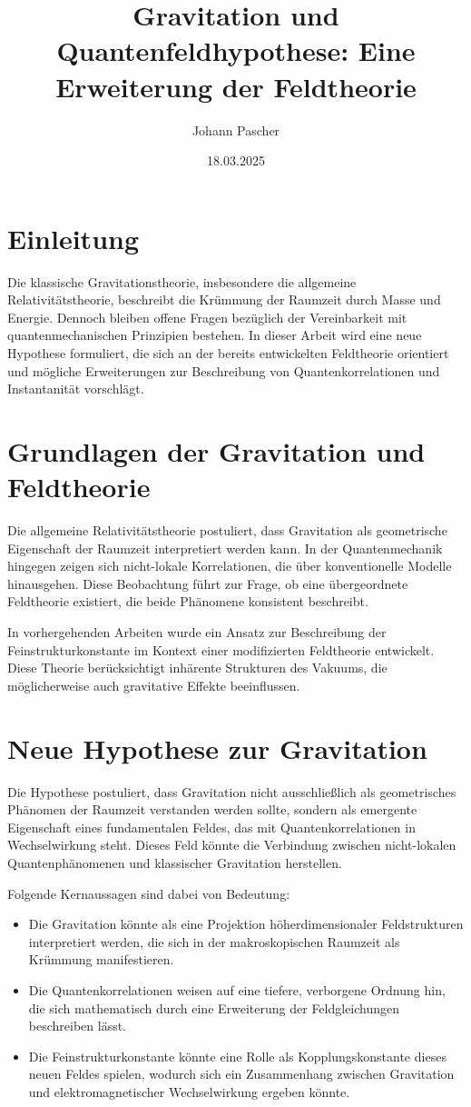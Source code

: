\documentclass[a4paper,11pt]{article}
\title{Gravitation und Quantenfeldhypothese: Eine Erweiterung der Feldtheorie}
\author{Johann Pascher}
\date{18.03.2025}
\begin{document}
	
	\maketitle
	\tableofcontents
	\section{Einleitung}
	Die klassische Gravitationstheorie, insbesondere die allgemeine Relativitätstheorie, beschreibt die Krümmung der Raumzeit durch Masse und Energie. Dennoch bleiben offene Fragen bezüglich der Vereinbarkeit mit quantenmechanischen Prinzipien bestehen. In dieser Arbeit wird eine neue Hypothese formuliert, die sich an der bereits entwickelten Feldtheorie orientiert und mögliche Erweiterungen zur Beschreibung von Quantenkorrelationen und Instantanität vorschlägt.
	
	\section{Grundlagen der Gravitation und Feldtheorie}
	Die allgemeine Relativitätstheorie postuliert, dass Gravitation als geometrische Eigenschaft der Raumzeit interpretiert werden kann. In der Quantenmechanik hingegen zeigen sich nicht-lokale Korrelationen, die über konventionelle Modelle hinausgehen. Diese Beobachtung führt zur Frage, ob eine übergeordnete Feldtheorie existiert, die beide Phänomene konsistent beschreibt.
	
	In vorhergehenden Arbeiten wurde ein Ansatz zur Beschreibung der Feinstrukturkonstante im Kontext einer modifizierten Feldtheorie entwickelt. Diese Theorie berücksichtigt inhärente Strukturen des Vakuums, die möglicherweise auch gravitative Effekte beeinflussen.
	
	\section{Neue Hypothese zur Gravitation}
	Die Hypothese postuliert, dass Gravitation nicht ausschließlich als geometrisches Phänomen der Raumzeit verstanden werden sollte, sondern als emergente Eigenschaft eines fundamentalen Feldes, das mit Quantenkorrelationen in Wechselwirkung steht. Dieses Feld könnte die Verbindung zwischen nicht-lokalen Quantenphänomenen und klassischer Gravitation herstellen.
	
	Folgende Kernaussagen sind dabei von Bedeutung:
	\begin{itemize}
		\item Die Gravitation könnte als eine Projektion höherdimensionaler Feldstrukturen interpretiert werden, die sich in der makroskopischen Raumzeit als Krümmung manifestieren.
		\item Die Quantenkorrelationen weisen auf eine tiefere, verborgene Ordnung hin, die sich mathematisch durch eine Erweiterung der Feldgleichungen beschreiben lässt.
		\item Die Feinstrukturkonstante könnte eine Rolle als Kopplungskonstante dieses neuen Feldes spielen, wodurch sich ein Zusammenhang zwischen Gravitation und elektromagnetischer Wechselwirkung ergeben könnte.
	\end{itemize}
	
\end{document}
